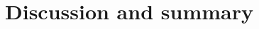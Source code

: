 \documentclass[pdftex,twocolumn,epjc3]{svjour3}          %
\begin{document}
\section{Discussion and summary}

\begin{acknowledgements}
\end{acknowledgements}



\end{document}
